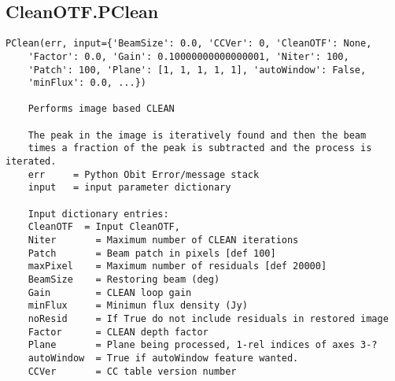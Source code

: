 \documentclass[11pt]{report}
\begin{document}
\subsection{CleanOTF.PClean}
\begin{verbatim}
PClean(err, input={'BeamSize': 0.0, 'CCVer': 0, 'CleanOTF': None,
    'Factor': 0.0, 'Gain': 0.10000000000000001, 'Niter': 100, 
    'Patch': 100, 'Plane': [1, 1, 1, 1, 1], 'autoWindow': False, 
    'minFlux': 0.0, ...})

    Performs image based CLEAN
    
    The peak in the image is iteratively found and then the beam
    times a fraction of the peak is subtracted and the process is iterated.  
    err     = Python Obit Error/message stack
    input   = input parameter dictionary
    
    Input dictionary entries:
    CleanOTF  = Input CleanOTF,
    Niter       = Maximum number of CLEAN iterations
    Patch       = Beam patch in pixels [def 100]
    maxPixel    = Maximum number of residuals [def 20000]
    BeamSize    = Restoring beam (deg)
    Gain        = CLEAN loop gain
    minFlux     = Minimun flux density (Jy)
    noResid     = If True do not include residuals in restored image
    Factor      = CLEAN depth factor
    Plane       = Plane being processed, 1-rel indices of axes 3-?
    autoWindow  = True if autoWindow feature wanted.
    CCVer       = CC table version number
\end{verbatim}
\end{document}
